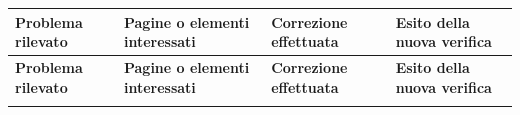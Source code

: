 \documentclass[11pt, a4paper]{article}
\begin{document}
\small
\setlength{\tabcolsep}{3pt}
\renewcommand{\arraystretch}{1.2}
\setlength{\LTleft}{0pt plus 1fill}
\setlength{\LTright}{0pt plus 1fill}
\begin{longtable}{|
>{\raggedright\arraybackslash}p{3.1cm}|
>{\raggedright\arraybackslash}p{4.5cm}|
>{\raggedright\arraybackslash}p{5.5cm}|
>{\raggedright\arraybackslash}p{2.5cm}|}
\hline
\textbf{Problema rilevato} & \textbf{Pagine o elementi interessati} & \textbf{Correzione effettuata} & \textbf{Esito della nuova verifica} \\
\hline
\endfirsthead

\textbf{Problema rilevato} & \textbf{Pagine o elementi interessati} & \textbf{Correzione effettuata} & \textbf{Esito della nuova verifica} \\
\hline
\endhead

\endfoot

\hline
\endlastfoot


\end{longtable}
\end{document}
